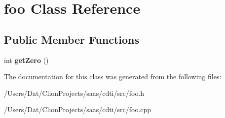 \hypertarget{classfoo}{}\section{foo Class Reference}
\label{classfoo}
\subsection*{Public Member Functions}
\begin{DoxyCompactItemize}
\item 
int {\bfseries get\+Zero} ()\hypertarget{classfoo_a86a78c0e319fbd776c8355cfb6103bd4}{}\label{classfoo_a86a78c0e319fbd776c8355cfb6103bd4}

\end{DoxyCompactItemize}


The documentation for this class was generated from the following files\+:\begin{DoxyCompactItemize}
\item 
/\+Users/\+Dat/\+Clion\+Projects/saas/cdti/src/foo.\+h\item 
/\+Users/\+Dat/\+Clion\+Projects/saas/cdti/src/foo.\+cpp\end{DoxyCompactItemize}
